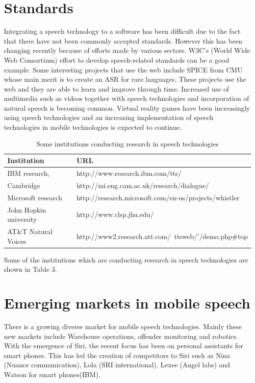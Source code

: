 \documentclass[11pt,a4paper,oneside,article]{memoir}
\begin{document}
\section{Standards}
Integrating a speech technology to a software has been difficult due to the fact that there have not been commonly accepted standards. However this has been changing recently because of efforts made by various sectors. W3C's (World Wide Web Consortium) effort to develop speech-related standards can be a good example. Some interesting projects that use the web include SPICE from CMU whose main merit is to create an ASR for rare languages. These projects use the web and they are able to learn and improve through time. Increased use of multimedia such as videos together with speech technologies and incorporation of natural speech is becoming common. Virtual reality games have been increasingly using speech technologies and an increasing implementation of speech technologies in mobile technologies is expected to continue. \cite{rob}

\begin{table}[h]
 \caption{Some institutions conducting research in speech technologies}
    \begin{tabular}{ | l | l | }
    \hline
    \textbf{Institution} & \textbf{URL} \\ \hline
    IBM research, & http://www.research.ibm.com/tts/ \\ \hline
    Cambridge &  http://mi.eng.cam.ac.uk/research/dialogue/   \\ \hline
    Microsoft research &  http://research.microsoft.com/en-us/projects/whistler \\ \hline
    John Hopkin university &  http://www.clsp.jhu.edu/   \\ \hline
    AT\&T Natural Voices & http://www2.research.att.com/~ttsweb/'/demo.php\#top  \\ \hline
    \end{tabular}
\end{table}

Some of the institutions which are conducting research in speech technologies are shown in Table 3.

\section{Emerging markets in mobile speech}
There is a growing diverse market for mobile speech technologies. Mainly these new markets include Warehouse operations, offender monitoring and robotics. With the emergence of Siri, the recent focus has been on personal assistants for smart phones. This has led the creation of competitors to Siri such as Nina (Nuance communication), Lola (SRI international), Lexee (Angel labs) and Watson for smart phones(IBM). \cite{markowitz}
\end{document}
